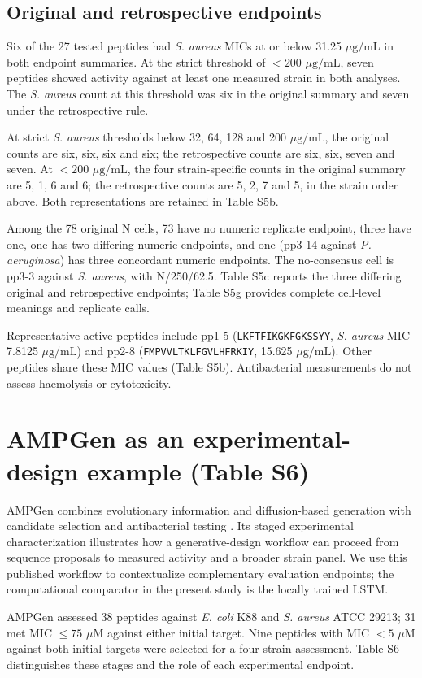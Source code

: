 \documentclass[11pt,a4paper]{article}
\newcommand{\ug}{\ensuremath{\mu\mathrm{g}/\mathrm{mL}}}
\begin{document}
\subsection*{Original and retrospective endpoints}
Six of the 27 tested peptides had \textit{S. aureus} MICs at or below 31.25 \ug{} in both endpoint summaries. At the strict threshold of $<200$ \ug, seven peptides showed activity against at least one measured strain in both analyses. The \textit{S. aureus} count at this threshold was six in the original summary and seven under the retrospective rule.

At strict \textit{S. aureus} thresholds below 32, 64, 128 and 200 \ug, the original counts are six, six, six and six; the retrospective counts are six, six, seven and seven. At $<200$ \ug, the four strain-specific counts in the original summary are 5, 1, 6 and 6; the retrospective counts are 5, 2, 7 and 5, in the strain order above. Both representations are retained in Table S5b.

Among the 78 original N cells, 73 have no numeric replicate endpoint, three have one, one has two differing numeric endpoints, and one (pp3-14 against \textit{P. aeruginosa}) has three concordant numeric endpoints. The no-consensus cell is pp3-3 against \textit{S. aureus}, with N/250/62.5. Table S5c reports the three differing original and retrospective endpoints; Table S5g provides complete cell-level meanings and replicate calls.

Representative active peptides include pp1-5 (\texttt{LKFTFIKGKFGKSSYY}, \textit{S. aureus} MIC 7.8125 \ug) and pp2-8 (\texttt{FMPVVLTKLFGVLHFRKIY}, 15.625 \ug). Other peptides share these MIC values (Table S5b). Antibacterial measurements do not assess haemolysis or cytotoxicity.


\section{AMPGen as an experimental-design example (Table S6)}
AMPGen combines evolutionary information and diffusion-based generation with candidate selection and antibacterial testing \cite{ref9}. Its staged experimental characterization illustrates how a generative-design workflow can proceed from sequence proposals to measured activity and a broader strain panel. We use this published workflow to contextualize complementary evaluation endpoints; the computational comparator in the present study is the locally trained LSTM.

AMPGen assessed 38 peptides against \textit{E. coli} K88 and \textit{S. aureus} ATCC 29213; 31 met MIC $\leq75$ $\mu$M against either initial target. Nine peptides with MIC $<5$ $\mu$M against both initial targets were selected for a four-strain assessment. Table S6 distinguishes these stages and the role of each experimental endpoint.

\end{document}
